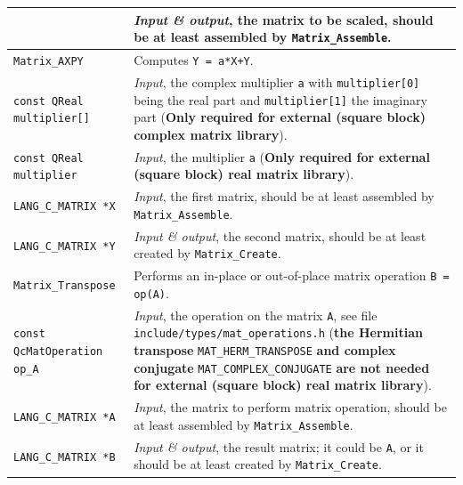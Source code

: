 \documentclass[a4paper,11pt,twoside,openright]{book}
\begin{document}
\begin{center}
\begin{longtable}{l|p{}}
      & \textsl{Input \& output}, the matrix to be scaled, should be at least assembled
        by \verb|Matrix_Assemble|.\\
    \hline
%
    \verb|Matrix_AXPY|\index{\texttt{Matrix\_AXPY}} %
      & Computes \verb|Y = a*X+Y|.\\
    \hspace*{2ex}\verb|const QReal multiplier[]| %
      & \textsl{Input}, the complex multiplier \verb|a| with \verb|multiplier[0]|
        being the real part and \verb|multiplier[1]| the imaginary part %
        (\textbf{Only required for external (square block) complex matrix library}).\\
    \hspace*{2ex}\verb|const QReal multiplier| %
      & \textsl{Input}, the multiplier \verb|a| %
        (\textbf{Only required for external (square block) real matrix library}).\\
    \hspace*{2ex}\verb|LANG_C_MATRIX *X| %
      & \textsl{Input}, the first matrix, should be at least assembled
        by \verb|Matrix_Assemble|.\\
    \hspace*{2ex}\verb|LANG_C_MATRIX *Y| %
      & \textsl{Input \& output}, the second matrix, should be at least created
        by \verb|Matrix_Create|.\\
    \hline
%
    \verb|Matrix_Transpose|\index{\texttt{Matrix\_Transpose}} %
      & Performs an in-place or out-of-place matrix operation \verb|B = op(A)|.\\
    \hspace*{2ex}\verb|const QcMatOperation op_A| %
      & \textsl{Input}, the operation on the matrix \verb|A|, see file
        \verb|include/types/mat_operations.h| (\textbf{the Hermitian transpose}
        \verb|MAT_HERM_TRANSPOSE| \textbf{and complex conjugate}
        \verb|MAT_COMPLEX_CONJUGATE| \textbf{are not needed for external (square block)
        real matrix library}).\\
    \hspace*{2ex}\verb|LANG_C_MATRIX *A| %
      & \textsl{Input}, the matrix to perform matrix operation, should be
        at least assembled by \verb|Matrix_Assemble|.\\
    \hspace*{2ex}\verb|LANG_C_MATRIX *B| %
      & \textsl{Input \& output}, the result matrix; it could be \verb|A|, or it should
        be at least created by \verb|Matrix_Create|.\\

\end{longtable}
\end{center}
\end{document}
